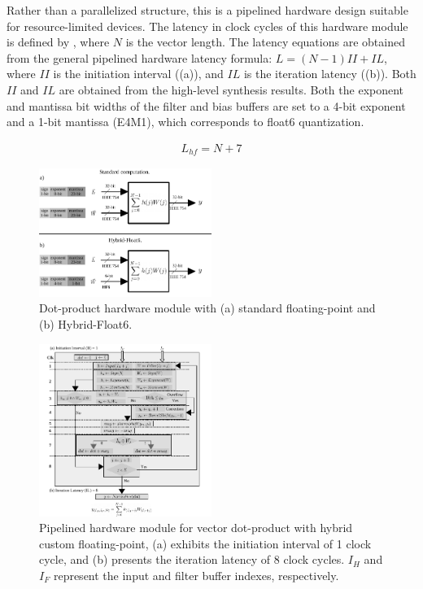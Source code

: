 Rather than a parallelized structure, this is a pipelined hardware design suitable for resource-limited devices. The latency in clock cycles of this hardware module is defined by , where $N$ is the vector length. The latency equations are obtained from the general pipelined hardware latency formula: $L=\left(N-1\right)II+IL$, where $II$ is the initiation interval ((a)), and $IL$ is the iteration latency ((b)). Both $II$ and $IL$ are obtained from the high-level synthesis results. Both the exponent and mantissa bit widths of the filter and bias buffers are set to a 4-bit exponent and a 1-bit mantissa (E4M1), which corresponds to float6 quantization.

\begin{eqnarray} \label{eq:dot_custom_float_latency}
L_{hf}=N+7
\end{eqnarray}

\begin{figure}[t!]
	\centering
	\includegraphics[width=0.5\textwidth]{../figures/dot-product_unit.pdf}
	\caption{Dot-product hardware module with (a) standard floating-point and (b) Hybrid-Float6.}
	\label{fig:dot_product}
\end{figure}

\begin{figure}[t!]
	\centering
	\includegraphics[width=0.5\textwidth]{../figures/dot_product_hybrid.pdf}
	\caption{Pipelined hardware module for vector dot-product with hybrid custom floating-point, (a) exhibits the initiation interval of 1 clock cycle, and (b) presents
		the iteration latency of 8 clock cycles. $I_H$ and $I_F$ represent the input and filter buffer indexes, respectively.}
	\label{fig:dot_product_hybrid}
\end{figure}

